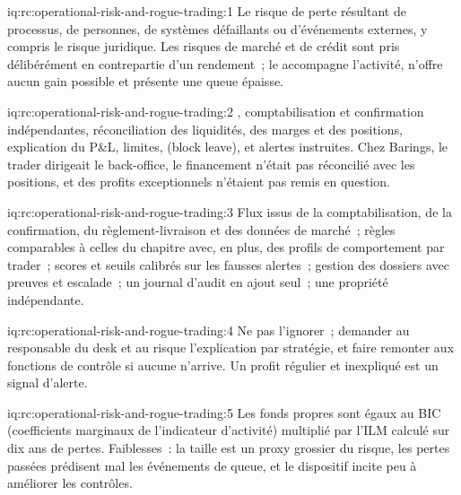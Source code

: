 \begin{solution}{iq:rc:operational-risk-and-rogue-trading:1}
Le risque de perte résultant de processus, de personnes, de systèmes défaillants ou d'événements externes, y compris le risque juridique.
Les risques de marché et de crédit sont pris délibérément en contrepartie d'un rendement~; le  accompagne l'activité,
n'offre aucun gain possible et présente une queue épaisse.
\end{solution}

\begin{solution}{iq:rc:operational-risk-and-rogue-trading:2}
, comptabilisation et confirmation indépendantes, réconciliation des liquidités, des marges et des
positions, explication du P\&L, limites,  (block leave), et alertes instruites. Chez Barings, le trader dirigeait
le back-office, le financement n'était pas réconcilié avec les positions, et des profits exceptionnels n'étaient pas remis en question.
\end{solution}

\begin{solution}{iq:rc:operational-risk-and-rogue-trading:3}
Flux issus de la comptabilisation, de la confirmation, du règlement-livraison et des données de marché~; règles comparables à celles du chapitre
avec, en plus, des profils de comportement par trader~; scores et seuils calibrés sur les fausses alertes~; gestion des dossiers avec preuves et
escalade~; un journal d'audit en ajout seul~; une propriété indépendante.
\end{solution}

\begin{solution}{iq:rc:operational-risk-and-rogue-trading:4}
Ne pas l'ignorer~; demander au responsable du desk et au risque l'explication par stratégie, et faire remonter aux fonctions de contrôle si aucune
n'arrive. Un profit régulier et inexpliqué est un signal d'alerte.
\end{solution}

\begin{solution}{iq:rc:operational-risk-and-rogue-trading:5}
Les fonds propres sont égaux au BIC (coefficients marginaux de l'indicateur d'activité) multiplié par l'ILM calculé sur dix ans de
pertes. Faiblesses~: la taille est un proxy grossier du risque, les pertes passées prédisent mal les événements de queue, et le dispositif
incite peu à améliorer les contrôles.
\end{solution}

